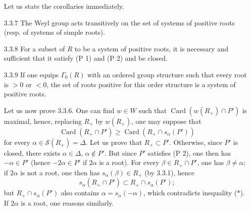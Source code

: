 Let us state the corollaries immediately.
\begin{corollary}{3.3.7}\label{XXI.3.3.7}
The Weyl group acts transitively on the set of systems of positive roots (resp. of systems of simple roots).
\end{corollary}
\begin{corollary}{3.3.8}\label{XXI.3.3.8}
For a subset of $R$ to be a system of positive roots, it is necessary and sufficient that it satisfy (P 1) and (P 2) and be closed.
\end{corollary}
\begin{corollary}{3.3.9}\label{XXI.3.3.9}
If one equips $\Gamma_0(R)$ with an ordered group structure such that every root is $>0$ or $<0$, the set of roots positive for this order structure is a system of positive roots.
\end{corollary}
Let us now prove 3.3.6. One can find $w\in W$ such that $\operatorname{Card}(w(R_+)\cap P')$ is maximal, hence, replacing $R_+$ by $w(R_+)$, one may suppose that
\begin{equation}\tag{$*$}\label{XXI.eq.star}
\operatorname{Card}(R_+\cap P')\geq\operatorname{Card}(R_+\cap s_\alpha(P'))
\end{equation}
for every $\alpha\in\mathcal S(R_+)=\Delta$. Let us prove that $R_+\subset P'$. Otherwise, since $P'$ is closed, there exists $\alpha\in\Delta$, $\alpha\notin P'$. But since $P'$ satisfies (P 2), one then has $-\alpha\in P'$ (hence $-2\alpha\in P'$ if $2\alpha$ is a root). For every $\beta\in R_+\cap P'$, one has $\beta\ne\alpha$; if $2\alpha$ is not a root, one then has $s_\alpha(\beta)\in R_+$ (by 3.3.1), hence
\[
s_\alpha(R_+\cap P')\subset R_+\cap s_\alpha(P');
\]
but $R_+\cap s_\alpha(P')$ also contains $\alpha=s_\alpha(-\alpha)$, which contradicts inequality ($*$). If $2\alpha$ is a root, one reasons similarly.

